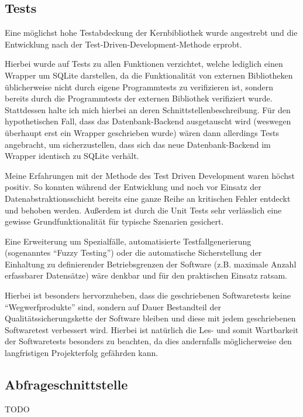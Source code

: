 \subsection{Tests}
Eine möglichst hohe Testabdeckung der Kernbibliothek wurde angestrebt und die Entwicklung nach der
Test-Driven-Development-Methode erprobt.

Hierbei wurde auf Tests zu allen Funktionen verzichtet, welche lediglich einen Wrapper um SQLite darstellen, da die
Funktionalität von externen Bibliotheken üblicherweise nicht durch eigene Programmtests zu verifizieren ist, sondern
bereits durch die Programmtests der externen Bibliothek verifiziert wurde. Stattdessen halte ich mich hierbei an deren
Schnittstellenbeschreibung.
Für den hypothetischen Fall, dass das Datenbank-Backend ausgetauscht wird (weswegen überhaupt erst ein Wrapper
geschrieben wurde) wären dann allerdings Tests angebracht, um sicherzustellen, dass sich das neue Datenbank-Backend im
Wrapper identisch zu SQLite verhält.

Meine Erfahrungen mit der Methode des Test Driven Development waren höchst positiv. So konnten während der Entwicklung
und noch vor Einsatz der Datenabstraktionsschicht bereits eine ganze Reihe an kritischen Fehler entdeckt und behoben werden.
Außerdem ist durch die Unit Tests sehr verlässlich eine gewisse Grundfunktionalität für typische Szenarien gesichert.

Eine Erweiterung um Spezialfälle, automatisierte Testfallgenerierung (sogenanntes ``Fuzzy Testing'') oder die automatische
Sicherstellung der Einhaltung zu definierender Betriebsgrenzen der Software (z.B. maximale Anzahl erfassbarer Datensätze)
wäre denkbar und für den praktischen Einsatz ratsam.

Hierbei ist besonders hervorzuheben, dass die geschriebenen Softwaretests keine ``Wegwerfprodukte'' sind, sondern auf
Dauer Bestandteil der Qualitätssicherungskette der Software bleiben und diese mit jedem geschriebenen Softwaretest
verbessert wird. Hierbei ist natürlich die Les- und somit Wartbarkeit der Softwaretests besonders zu beachten, da dies
andernfalls möglicherweise den langfristigen Projekterfolg gefährden kann.

\subsection{Abfrageschnittstelle}
TODO

